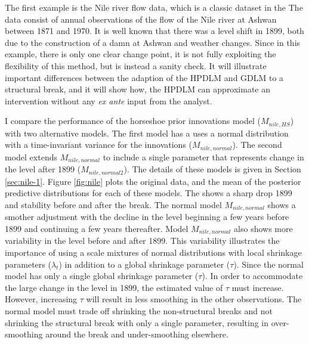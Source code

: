 \documentclass{article}
\begin{document}
The first example is the Nile river flow data, which is a classic dataset in the  \parencites{Cobb1978}{Balke1993}{JongPenzer1998}{DurbinKoopman2001}{DurbinKoopman2012}
The data consist of annual observations of the flow of the Nile river at Ashwan between 1871 and 1970.
It is well known that there was a level shift in 1899, both due to the construction of a damn at Ashwan and weather changes.
Since in this example, there is only one clear change point, it is not fully exploiting the flexibility of this method, but is instead a sanity check.
It will illustrate important differences between the adaption of the HPDLM and GDLM to a structural break,
and it will show how, the HPDLM can approximate an intervention without any \textit{ex ante} input from the analyst.

I compare the performance of the horseshoe prior innovations model ($M_{nile,HS}$) with two alternative models.
The first model has a uses a normal distribution with a time-invariant variance for the innovations ($M_{nile,normal}$).
The second model extends $M_{nile,normal}$ to include a single parameter that represents change in the level after 1899 ($M_{nile,normal2}$).
The details of these models is given in Section \ref{sec:nile-1}.
Figure \ref{fig:nile} plots the original data, and the mean of the posterior predictive distributions for each of these models.
The  shows a sharp drop 1899 and stability before and after the break.
The normal model $M_{nile,normal}$ shows a smother adjustment with the decline in the level beginning a few years before 1899 and continuing a few years thereafter.
Model $M_{nile,normal}$ also shows more variability in the level before and after 1899.
This variability illustrates the importance of using a scale mixtures of normal distributions with local shrinkage parameters ($\lambda_{t}$) in addition to a global shrinkage parameter ($\tau$).
Since the normal model has only a single global shrinkage parameter ($\tau$). 
In order to accommodate the large change in the level in 1899, the estimated value of $\tau$ must increase.
However, increasing $\tau$ will result in less smoothing in the other observations.
The normal model must trade off shrinking the non-structural breaks and not shrinking the structural break with only a single parameter, resulting in over-smoothing around the break and under-smoothing elsewhere.
\end{document}
